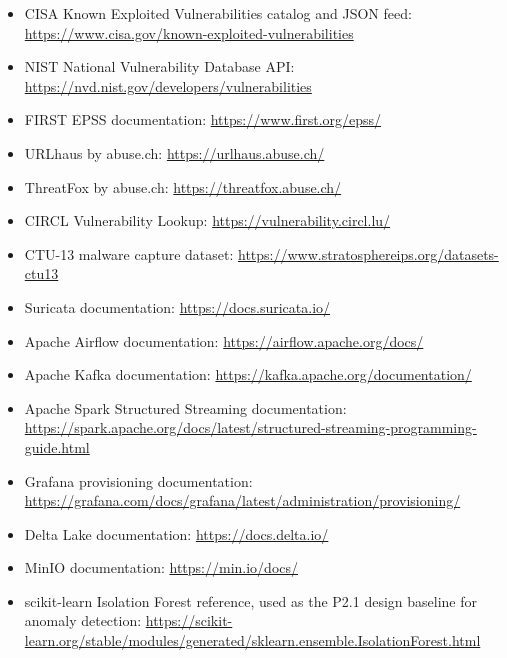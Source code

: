 \documentclass[11pt,a4paper]{article}
\begin{document}
{\small
\begin{itemize}
  \item CISA Known Exploited Vulnerabilities catalog and JSON feed: \url{https://www.cisa.gov/known-exploited-vulnerabilities}
  \item NIST National Vulnerability Database API: \url{https://nvd.nist.gov/developers/vulnerabilities}
  \item FIRST EPSS documentation: \url{https://www.first.org/epss/}
  \item URLhaus by abuse.ch: \url{https://urlhaus.abuse.ch/}
  \item ThreatFox by abuse.ch: \url{https://threatfox.abuse.ch/}
  \item CIRCL Vulnerability Lookup: \url{https://vulnerability.circl.lu/}
  \item CTU-13 malware capture dataset: \url{https://www.stratosphereips.org/datasets-ctu13}
  \item Suricata documentation: \url{https://docs.suricata.io/}
  \item Apache Airflow documentation: \url{https://airflow.apache.org/docs/}
  \item Apache Kafka documentation: \url{https://kafka.apache.org/documentation/}
  \item Apache Spark Structured Streaming documentation: \url{https://spark.apache.org/docs/latest/structured-streaming-programming-guide.html}
  \item Grafana provisioning documentation: \url{https://grafana.com/docs/grafana/latest/administration/provisioning/}
  \item Delta Lake documentation: \url{https://docs.delta.io/}
  \item MinIO documentation: \url{https://min.io/docs/}
  \item scikit-learn Isolation Forest reference, used as the P2.1 design baseline for anomaly detection: \url{https://scikit-learn.org/stable/modules/generated/sklearn.ensemble.IsolationForest.html}
\end{itemize}
}
\end{document}
